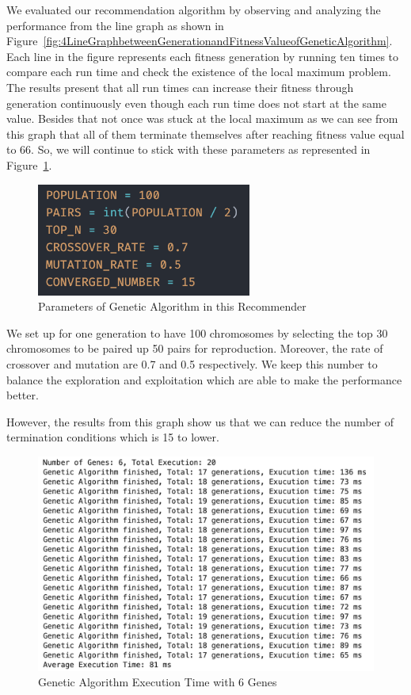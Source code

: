 \documentclass[12pt,oneside,openright,a4paper]{cpe-english-project}
\begin{document}
We evaluated our recommendation algorithm by observing and analyzing the performance from the line graph as shown in Figure~\ref{fig:4LineGraphbetweenGenerationandFitnessValueofGeneticAlgorithm}. Each line in the figure represents each fitness generation by running ten times to compare each run time and check the existence of the local maximum problem. The results present that all run times can increase their fitness through generation continuously even though each run time does not start at the same value. Besides that not once was stuck at the local maximum as we can see from this graph that all of them terminate themselves after reaching fitness value equal to 66. So, we will continue to stick with these parameters as represented in Figure~\ref{fig:4ParametersofGeneticAlgorithminthisRecommender}.

\begin{figure}[H]\centering
\includegraphics[width=200pt]{./images/4ParametersofGeneticAlgorithminthisRecommender.png}
\caption{Parameters of Genetic Algorithm in this Recommender}\label{fig:4ParametersofGeneticAlgorithminthisRecommender}
\end{figure}\vspace{-24pt}

We set up for one generation to have 100 chromosomes by selecting the top 30 chromosomes to be paired up 50 pairs for reproduction. Moreover, the rate of crossover and mutation are 0.7 and 0.5 respectively. We keep this number to balance the exploration and exploitation which are able to make the performance better.

However, the results from this graph show us that we can reduce the number of termination conditions which is 15 to lower.

\begin{figure}[H]\centering
\includegraphics[width=350pt]{./images/4GeneticAlgorithmExecutionTimewith6Genes.png}
\caption{Genetic Algorithm Execution Time with 6 Genes}\label{fig:4GeneticAlgorithmExecutionTimewith6Genes}
\end{figure}\vspace{-24pt}
\end{document}
